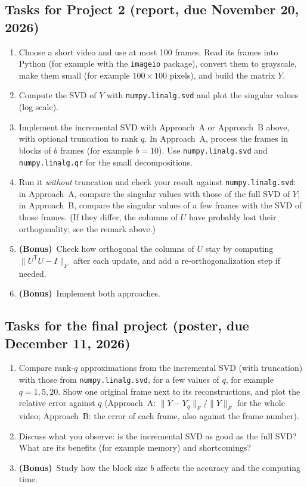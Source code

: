 \documentclass[11pt,a4paper]{article}
\newcommand{\bonus}{\textbf{(Bonus)}}
\begin{document}
\subsection*{Tasks for Project 2 (report, due November 20, 2026)}
\begin{enumerate}
  \item Choose a short video and use at most 100 frames. Read its
        frames into Python (for example with the \texttt{imageio} package),
        convert them to grayscale, make them small (for example
        $100 \times 100$ pixels), and build the matrix $Y$.
  \item Compute the SVD of $Y$ with \texttt{numpy.linalg.svd} \cite{numpy}
        and plot the singular values (log scale).
  \item Implement the incremental SVD with Approach~A or Approach~B above,
        with optional truncation to rank $q$. In Approach~A, process the
        frames in blocks of $b$ frames (for example $b = 10$). Use
        \texttt{numpy.linalg.svd} and \texttt{numpy.linalg.qr} for the small
        decompositions.
  \item Run it \emph{without} truncation and check your result against
        \texttt{numpy.linalg.svd}: in Approach~A, compare the singular
        values with those of the full SVD of $Y$; in Approach~B, compare the
        singular values of a few frames with the SVD of those frames. (If
        they differ, the columns of $U$ have probably lost their
        orthogonality; see the remark above.)
  \item \bonus\ Check how orthogonal the columns of $U$ stay by computing
        $\lVert U^{\mathsf{T}} U - I \rVert_F$ after each update, and add a
        re-orthogonalization step if needed.
  \item \bonus\ Implement both approaches.
\end{enumerate}

\subsection*{Tasks for the final project (poster, due December 11, 2026)}
\begin{enumerate}
  \item Compare rank-$q$ approximations from the incremental SVD (with
        truncation) with those from \texttt{numpy.linalg.svd}, for a few
        values of $q$, for example $q = 1, 5, 20$. Show one original frame
        next to its reconstructions, and plot the relative error against $q$
        (Approach~A: $\lVert Y - Y_q \rVert_F / \lVert Y \rVert_F$ for the
        whole video; Approach~B: the error of each frame, also against the
        frame number).
  \item Discuss what you observe: is the incremental SVD as good as the full
        SVD? What are its benefits (for example memory) and shortcomings?
  \item \bonus\ Study how the block size $b$ affects the accuracy and the
        computing time.
\end{enumerate}
\end{document}
